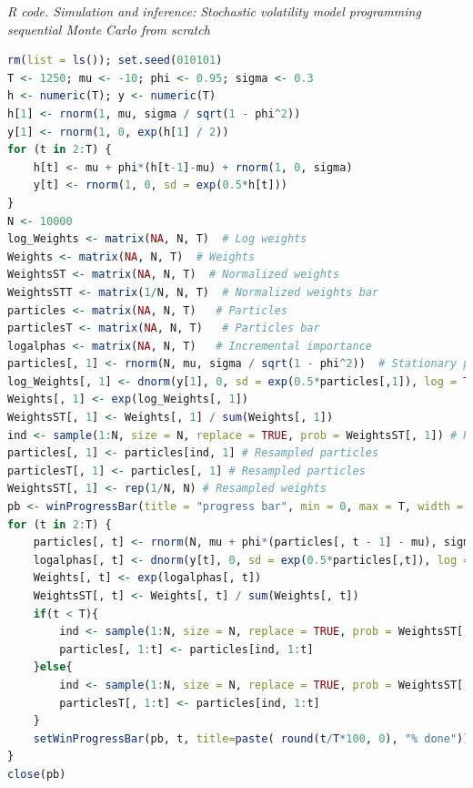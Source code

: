 \begin{tcolorbox}[enhanced,width=4.67in,center upper,
	fontupper=\large\bfseries,drop shadow southwest,sharp corners]
	\textit{R code. Simulation and inference: Stochastic volatility model programming sequential Monte Carlo from scratch}
	\begin{VF}
		\begin{lstlisting}[language=R]
rm(list = ls()); set.seed(010101)
T <- 1250; mu <- -10; phi <- 0.95; sigma <- 0.3
h <- numeric(T); y <- numeric(T)
h[1] <- rnorm(1, mu, sigma / sqrt(1 - phi^2))  
y[1] <- rnorm(1, 0, exp(h[1] / 2))           
for (t in 2:T) {
	h[t] <- mu + phi*(h[t-1]-mu) + rnorm(1, 0, sigma)
	y[t] <- rnorm(1, 0, sd = exp(0.5*h[t]))
}
N <- 10000
log_Weights <- matrix(NA, N, T)  # Log weights
Weights <- matrix(NA, N, T)  # Weights 
WeightsST <- matrix(NA, N, T)  # Normalized weights 
WeightsSTT <- matrix(1/N, N, T)  # Normalized weights bar 
particles <- matrix(NA, N, T)   # Particles
particlesT <- matrix(NA, N, T)   # Particles bar
logalphas <- matrix(NA, N, T)   # Incremental importance 
particles[, 1] <- rnorm(N, mu, sigma / sqrt(1 - phi^2))  # Stationary prior
log_Weights[, 1] <- dnorm(y[1], 0, sd = exp(0.5*particles[,1]), log = TRUE)  # Likelihood
Weights[, 1] <- exp(log_Weights[, 1])
WeightsST[, 1] <- Weights[, 1] / sum(Weights[, 1])
ind <- sample(1:N, size = N, replace = TRUE, prob = WeightsST[, 1]) # Resample 
particles[, 1] <- particles[ind, 1] # Resampled particles
particlesT[, 1] <- particles[, 1] # Resampled particles
WeightsST[, 1] <- rep(1/N, N) # Resampled weights
pb <- winProgressBar(title = "progress bar", min = 0, max = T, width = 300)
for (t in 2:T) {
	particles[, t] <- rnorm(N, mu + phi*(particles[, t - 1] - mu), sigma)  # Sample from proposal
	logalphas[, t] <- dnorm(y[t], 0, sd = exp(0.5*particles[,t]), log = TRUE) 
	Weights[, t] <- exp(logalphas[, t])
	WeightsST[, t] <- Weights[, t] / sum(Weights[, t])
	if(t < T){
		ind <- sample(1:N, size = N, replace = TRUE, prob = WeightsST[, t])
		particles[, 1:t] <- particles[ind, 1:t]
	}else{
		ind <- sample(1:N, size = N, replace = TRUE, prob = WeightsST[, t])
		particlesT[, 1:t] <- particles[ind, 1:t]
	}
	setWinProgressBar(pb, t, title=paste( round(t/T*100, 0), "% done"))
}
close(pb)
\end{lstlisting}
	\end{VF}
\end{tcolorbox}

